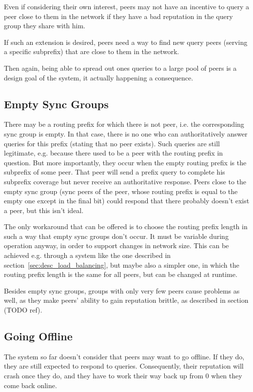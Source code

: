 Even if considering their own interest, peers may not have an incentive to query
a peer close to them in the network if they have a bad reputation in the query
group they share with him.

If such an extension is desired, peers need a way to find new query peers
(serving a specific subprefix) that are close to them in the network.

Then again, being able to spread out ones queries to a large pool of peers is a
design goal of the system, it actually happening a consequence.

\subsection{Empty Sync Groups}
\label{sec:desc_empty_sync_groups}
There may be a routing prefix for which there is not peer, i.e. the
corresponding sync group is empty. In that case, there is no one who can
authoritatively answer queries for this prefix (stating that no peer exists).
Such queries are still legitimate, e.g. because there used to be a peer with the
routing prefix in question. But more importantly, they occur when the empty
routing prefix is the subprefix of some peer. That peer will send a prefix query
to complete his subprefix coverage but never receive an authoritative response.
Peers close to the empty sync group (sync peers of the peer, whose routing
prefix is equal to the empty one except in the final bit) could respond that
there probably doesn't exist a peer, but this isn't ideal.

The only workaround that can be offered is to choose the routing prefix length
in such a way that empty sync groups don't occur. It must be variable during
operation anyway, in order to support changes in network size. This can be
achieved e.g. through a system like the one described in
section~\ref{sec:desc_load_balancing}, but maybe also a simpler one, in which
the routing prefix length is the same for all peers, but can be changed at
runtime.

Besides empty sync groups, groups with only very few peers cause problems as
well, as they make peers' ability to gain reputation brittle, as described in
section (TODO ref).

\subsection{Going Offline}
The system so far doesn't consider that peers may want to go offline. If they
do, they are still expected to respond to queries. Consequently, their
reputation will crash once they do, and they have to work their way back up from
0 when they come back online.


